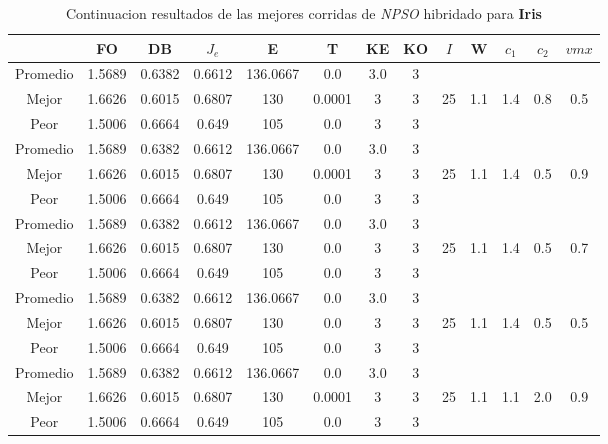 \begin{table}[h!]
    \footnotesize
    \begin{center}
        \begin{tabular}{|c|c|c|c|c|c|c|c|c|c|c|c|c|}
        \hline
            & {\bf FO} & {\bf DB} & $J_e$ & {\bf E} & {\bf T} & {\bf KE} & {\bf KO} & $I$ & W & $c_1$ & $c_2$ & $vmx$ \\
        \hline
        \hline
            Promedio  & 1.5689 & 0.6382 & 0.6612 & 136.0667 & 0.0 & 3.0 & 3 &  &  &  &  & \\
            \cline{1-8}
            Mejor & 1.6626 & 0.6015  & 0.6807 & 130 & 0.0001 & 3 & 3 & 25 & 1.1 & 1.4 & 0.8 & 0.5\\
            \cline{1-8}
            Peor & 1.5006 & 0.6664  & 0.649 & 105 & 0.0 & 3 & 3 &  &  &  &  & \\
        \hline
        \hline
            Promedio  & 1.5689 & 0.6382 & 0.6612 & 136.0667 & 0.0 & 3.0 & 3 &  &  &  &  & \\
            \cline{1-8}
            Mejor & 1.6626 & 0.6015  & 0.6807 & 130 & 0.0001 & 3 & 3 & 25 & 1.1 & 1.4 & 0.5 & 0.9\\
            \cline{1-8}
            Peor & 1.5006 & 0.6664  & 0.649 & 105 & 0.0 & 3 & 3 &  &  &  &  & \\
        \hline
        \hline
            Promedio  & 1.5689 & 0.6382 & 0.6612 & 136.0667 & 0.0 & 3.0 & 3 &  &  &  &  & \\
            \cline{1-8}
            Mejor & 1.6626 & 0.6015  & 0.6807 & 130 & 0.0 & 3 & 3 & 25 & 1.1 & 1.4 & 0.5 & 0.7\\
            \cline{1-8}
            Peor & 1.5006 & 0.6664  & 0.649 & 105 & 0.0 & 3 & 3 &  &  &  &  & \\
        \hline
        \hline
            Promedio  & 1.5689 & 0.6382 & 0.6612 & 136.0667 & 0.0 & 3.0 & 3 &  &  &  &  & \\
            \cline{1-8}
            Mejor & 1.6626 & 0.6015  & 0.6807 & 130 & 0.0 & 3 & 3 & 25 & 1.1 & 1.4 & 0.5 & 0.5\\
            \cline{1-8}
            Peor & 1.5006 & 0.6664  & 0.649 & 105 & 0.0 & 3 & 3 &  &  &  &  & \\
        \hline
        \hline
            Promedio  & 1.5689 & 0.6382 & 0.6612 & 136.0667 & 0.0 & 3.0 & 3 &  &  &  &  & \\
            \cline{1-8}
            Mejor & 1.6626 & 0.6015  & 0.6807 & 130 & 0.0001 & 3 & 3 & 25 & 1.1 & 1.1 & 2.0 & 0.9\\
            \cline{1-8}
            Peor & 1.5006 & 0.6664  & 0.649 & 105 & 0.0 & 3 & 3 &  &  &  &  & \\
        \hline
        \end{tabular}
        \caption{Continuacion resultados de las mejores corridas de \emph{NPSO} hibridado para {\bf Iris}}
        \label{tb:tablepsohibcsvc}
    \end{center}
\end{table}
